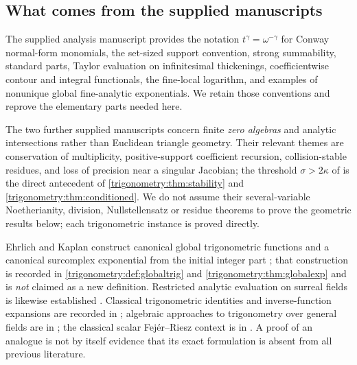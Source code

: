 \documentclass[11pt,letterpaper]{article}
\numberwithin{equation}{section}
\theoremstyle{definition}
\theoremstyle{remark}
\begin{document}
\subsection{What comes from the supplied manuscripts}\label{trigonometry:sec:provenance}
The supplied analysis manuscript \cite{SourceAnalysis} provides the notation
$t^\gamma=\omega^{-\gamma}$ for Conway normal-form monomials, the set-sized support convention,
strong summability, standard parts, Taylor evaluation on infinitesimal thickenings, coefficientwise
contour and integral functionals, the fine-local logarithm, and examples of nonunique global
fine-analytic exponentials. We retain those conventions and reprove the elementary parts needed
here.

The two further supplied manuscripts \cite{SourceGeometry,SourceIntersections} concern finite
\emph{zero algebras} and analytic intersections rather than Euclidean triangle geometry. Their
relevant themes are conservation of multiplicity, positive-support coefficient recursion,
collision-stable residues, and loss of precision near a singular Jacobian; the threshold
$\sigma>2\kappa$ of \cite[\S9]{SourceIntersections} is the direct antecedent of
\cref{trigonometry:thm:stability} and \cref{trigonometry:thm:conditioned}. We do not assume their
several-variable Noetherianity, division, Nullstellensatz or residue theorems to prove the
geometric results below; each trigonometric instance is proved directly.

Ehrlich and Kaplan construct canonical global trigonometric functions and a canonical surcomplex
exponential from the initial integer part \cite[\S11]{EK}; that construction is recorded in
\cref{trigonometry:def:globaltrig} and \cref{trigonometry:thm:globalexp} and is \emph{not} claimed
as a new definition. Restricted analytic evaluation on surreal fields is likewise established
\cite[Theorem 2.1]{vdDE}. Classical trigonometric identities and inverse-function expansions are
recorded in \cite{DLMF}; algebraic approaches to trigonometry over general fields are in
\cite{Wildberger,Gunn}; the classical scalar Fej\'er--Riesz context is in \cite{DR}. A proof of an
analogue is not by itself evidence that its exact formulation is absent from all previous
literature.
\end{document}
